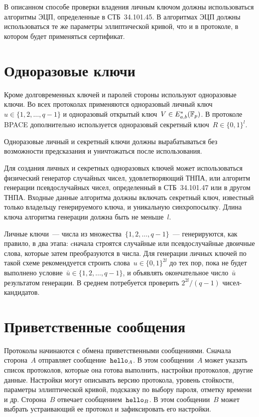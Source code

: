 В описанном способе проверки владения личным ключом должны использоваться
алгоритмы ЭЦП, определенные в СТБ~34.101.45. В алгоритмах ЭЦП должны
использоваться те же параметры эллиптической кривой, что и в протоколе, в
котором будет применяться сертификат.

\section{Одноразовые ключи}\label{COMMON.Ephemeral}

Кроме долговременных ключей и паролей стороны используют одноразовые ключи. Во
всех протоколах применяются одноразовый личный ключ~$u\in\{1,2,\ldots,q-1\}$ и
одноразовый открытый ключ~$V\in E_{a,b}^*(\mathbb{F}_p)$. В протоколе BPACE
дополнительно используется одноразовый секретный ключ~$R\in\{0,1\}^{l}$.

Одноразовые личный и секретный ключи должны вырабатываться без возможности
предсказания и уничтожаться после использования.

Для создания личных и секретных одноразовых ключей может использоваться
физический генератор случайных чисел, удовлетворяющий ТНПА, или алгоритм
генерации псевдослучайных чисел, определенный в СТБ~34.101.47 или в другом ТНПА.
Входные данные алгоритма должны включать секретный ключ, известный только
владельцу генерируемого ключа, и уникальную синхропосылку. Длина ключа алгоритма
генерации должна быть не меньше~$l$.

\begin{note*}
Личные ключи~--- числа из множества~$\{1,2,\ldots,q-1\}$~--- 
генерируются, как правило, в два этапа: cначала строятся случайные 
или псевдослучайные двоичные слова, которые затем преобразуются в числа. 
Для генерации личных ключей по такой схеме 
рекомендуется строить слова~$u\in\{0,1\}^{2l}$ до тех пор, 
пока не будет выполнено условие~$\bar{u}\in\{1,2,\ldots,q-1\}$,
и объявлять окончательное число~$\bar{u}$ результатом генерации.
В среднем потребуется проверить $2^{2l}/(q-1)$ чисел-кандидатов.
\end{note*}

\section{Приветственные сообщения}\label{COMMON.Hello}

Протоколы начинаются с обмена приветственными сообщениями.
Сначала сторона~$A$ отправляет сообщение~$\texttt{hello}_A$.
%
В этом сообщении~$A$ может указать список протоколов, которые она готова
выполнить, настройки протоколов, другие данные. Настройки могут описывать версию
протокола, уровень стойкости, параметры эллиптической кривой, подсказку по
выбору пароля, отметку времени и др.
%
Сторона~$B$ отвечает сообщением~$\texttt{hello}_B$.
%
В этом сообщении~$B$ может выбрать устраивающий ее протокол и зафиксировать его
настройки.


